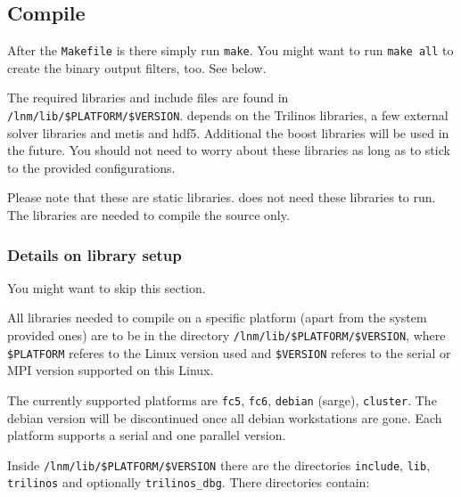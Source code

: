 \subsection{Compile}

After the \texttt{Makefile} is there simply run \texttt{make}. You
might want to run \texttt{make all} to create the binary output filters,
too. See below.

The required libraries and include files are found in \texttt{/lnm/lib/\$PLATFORM/\$VERSION}.
\ccarat{} depends on the Trilinos libraries, a few external solver
libraries and metis and hdf5. Additional the boost libraries will be
used in the future. You should not need to worry about these libraries
as long as to stick to the provided configurations.

Please note that these are static libraries. \ccarat{} does not need
these libraries to run. The libraries are needed to compile the source
only.


\subsubsection{Details on library setup}

You might want to skip this section.

All libraries needed to compile \ccarat{} on a specific platform
(apart from the system provided ones) are to be in the directory \texttt{/lnm/lib/\$PLATFORM/\$VERSION},
where \texttt{\$PLATFORM} referes to the Linux version used and \texttt{\$VERSION}
referes to the serial or MPI version supported on this Linux.

The currently supported platforms are \texttt{fc5}, \texttt{fc6},
\texttt{debian} (sarge), \texttt{cluster}. The debian version will
be discontinued once all debian workstations are gone. Each platform
supports a serial and one parallel version.

Inside \texttt{/lnm/lib/\$PLATFORM/\$VERSION} there are the directories
\texttt{include}, \texttt{lib}, \texttt{trilinos} and optionally \texttt{trilinos\_dbg}.
There directories contain:

